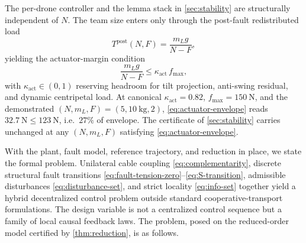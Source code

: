 The per-drone controller and the lemma stack in \cref{sec:stability} are structurally independent of $N$. The team size enters only through the post-fault redistributed load
\begin{equation}
  T^{\mathrm{post}}(N,F) = \frac{m_L g}{N-F},
   \label{eq:tension-postfault-N}
\end{equation}
yielding the actuator-margin condition
\begin{equation}
  \frac{m_L g}{N-F} \le \kappa_{\mathrm{act}}\,f_{\max},
   \label{eq:actuator-envelope}
\end{equation}
with $\kappa_{\mathrm{act}}\in(0,1)$ reserving headroom for tilt projection, anti-swing residual, and dynamic centripetal load. At canonical $\kappa_{\mathrm{act}}=0.82$, $f_{\max}=\SI{150}{\newton}$, and the demonstrated $(N,m_L,F)=(5,\SI{10}{\kilo\gram},2)$, \eqref{eq:actuator-envelope} reads $\SI{32.7}{\newton}\le\SI{123}{\newton}$, i.e.\ $27\%$ of envelope. The certificate of \cref{sec:stability} carries unchanged at any $(N,m_L,F)$ satisfying \eqref{eq:actuator-envelope}.
\label{sec:formal-problem}

With the plant, fault model, reference trajectory, and reduction in place, we state the formal problem. Unilateral cable coupling \eqref{eq:complementarity}, discrete structural fault transitions \eqref{eq:fault-tension-zero}--\eqref{eq:S-transition}, admissible disturbances \eqref{eq:disturbance-set}, and strict locality \eqref{eq:info-set} together yield a hybrid decentralized control problem outside standard cooperative-transport formulations. The design variable is not a centralized control sequence but a family of local causal feedback laws. The problem, posed on the reduced-order model certified by \cref{thm:reduction}, is as follows.

